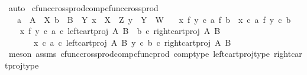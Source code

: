\begin{isabellebody}
\ auto\isanewline
{}\isamarkupfalse%
%
\endisatagproof
{\isafoldproof}%
%
\isadelimproof
\isanewline
%
\endisadelimproof
\isanewline
{}\isamarkupfalse%
\ cfunc{\isacharunderscore}{\kern0pt}cross{\isacharunderscore}{\kern0pt}prod{\isacharunderscore}{\kern0pt}comp{\isacharunderscore}{\kern0pt}cfunc{\isacharunderscore}{\kern0pt}cross{\isacharunderscore}{\kern0pt}prod{\isacharcolon}{\kern0pt}\isanewline
\ \ \ {\isachardoublequoteopen}a\ {\isacharcolon}{\kern0pt}\ A\ {\isasymrightarrow}\ X{\isachardoublequoteclose}\ {\isachardoublequoteopen}b\ {\isacharcolon}{\kern0pt}\ B\ {\isasymrightarrow}\ Y{\isachardoublequoteclose}\ {\isachardoublequoteopen}x\ {\isacharcolon}{\kern0pt}\ X\ {\isasymrightarrow}\ Z{\isachardoublequoteclose}\ {\isachardoublequoteopen}y\ {\isacharcolon}{\kern0pt}\ Y\ {\isasymrightarrow}\ W{\isachardoublequoteclose}\isanewline
\ \ \ {\isachardoublequoteopen}{\isacharparenleft}{\kern0pt}x\ {\isasymtimes}\isactrlsub f\ y{\isacharparenright}{\kern0pt}\ {\isasymcirc}\isactrlsub c\ {\isacharparenleft}{\kern0pt}a\ {\isasymtimes}\isactrlsub f\ b{\isacharparenright}{\kern0pt}\ {\isacharequal}{\kern0pt}\ {\isacharparenleft}{\kern0pt}x\ {\isasymcirc}\isactrlsub c\ a{\isacharparenright}{\kern0pt}\ {\isasymtimes}\isactrlsub f\ {\isacharparenleft}{\kern0pt}y\ {\isasymcirc}\isactrlsub c\ b{\isacharparenright}{\kern0pt}{\isachardoublequoteclose}\isanewline
%
\isadelimproof
%
\endisadelimproof
%
\isatagproof
{}\isamarkupfalse%
\ {\isacharminus}{\kern0pt}\isanewline
\ \ \isamarkupfalse%
\ {\isachardoublequoteopen}{\isacharparenleft}{\kern0pt}x\ {\isasymtimes}\isactrlsub f\ y{\isacharparenright}{\kern0pt}\ {\isasymcirc}\isactrlsub c\ {\isasymlangle}a\ {\isasymcirc}\isactrlsub c\ left{\isacharunderscore}{\kern0pt}cart{\isacharunderscore}{\kern0pt}proj\ A\ B\ {\isacharcomma}{\kern0pt}\ b\ {\isasymcirc}\isactrlsub c\ right{\isacharunderscore}{\kern0pt}cart{\isacharunderscore}{\kern0pt}proj\ A\ B{\isasymrangle}\isanewline
\ \ \ \ \ \ {\isacharequal}{\kern0pt}\ {\isasymlangle}x\ {\isasymcirc}\isactrlsub c\ a\ {\isasymcirc}\isactrlsub c\ left{\isacharunderscore}{\kern0pt}cart{\isacharunderscore}{\kern0pt}proj\ A\ B{\isacharcomma}{\kern0pt}\ y\ {\isasymcirc}\isactrlsub c\ b\ {\isasymcirc}\isactrlsub c\ right{\isacharunderscore}{\kern0pt}cart{\isacharunderscore}{\kern0pt}proj\ A\ B{\isasymrangle}{\isachardoublequoteclose}\isanewline
\ \ \ \ \isamarkupfalse%
\ {\isacharparenleft}{\kern0pt}meson\ assms\ cfunc{\isacharunderscore}{\kern0pt}cross{\isacharunderscore}{\kern0pt}prod{\isacharunderscore}{\kern0pt}comp{\isacharunderscore}{\kern0pt}cfunc{\isacharunderscore}{\kern0pt}prod\ comp{\isacharunderscore}{\kern0pt}type\ left{\isacharunderscore}{\kern0pt}cart{\isacharunderscore}{\kern0pt}proj{\isacharunderscore}{\kern0pt}type\ right{\isacharunderscore}{\kern0pt}cart{\isacharunderscore}{\kern0pt}proj{\isacharunderscore}{\kern0pt}type{\isacharparenright}{\kern0pt}\isanewline

\end{isabellebody}
